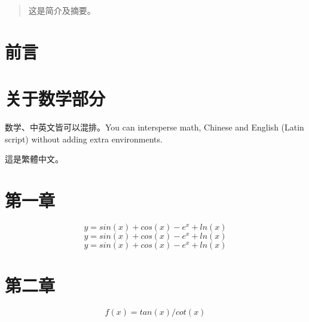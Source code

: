 \documentclass{ctexart}
\begin{document}
\tableofcontents

\begin{abstract}
这是简介及摘要。
\end{abstract}

\section{前言}

\section{关于数学部分}
数学、中英文皆可以混排。You can intersperse math, Chinese and English (Latin script) without adding extra environments.

這是繁體中文。

\section*{第一章}

\[y=sin(x)+cos(x)-e^x+ln(x)\]
\[y=sin(x)+cos(x)-e^x+ln(x)\]
\[y=sin(x)+cos(x)-e^x+ln(x)\]

\section*{第二章}

\[f(x)=tan(x)/cot(x)\]
\end{document}
